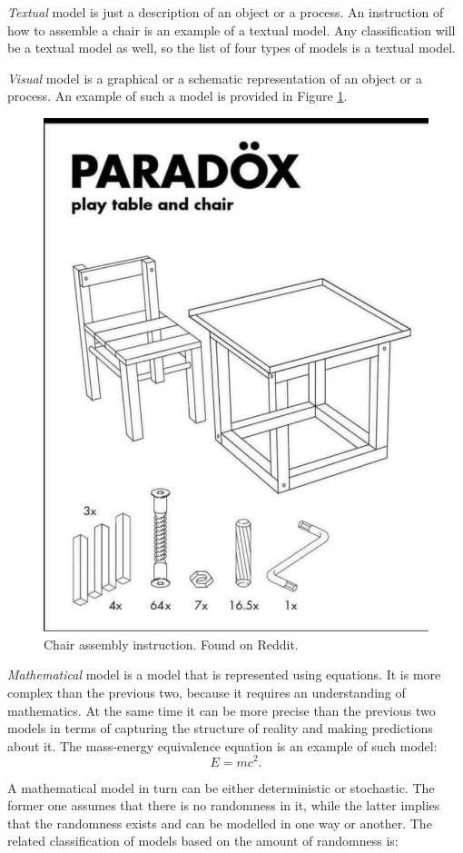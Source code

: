 \documentclass[
]{book}
\theoremstyle{definition}
\theoremstyle{definition}
\theoremstyle{definition}
\theoremstyle{definition}
\theoremstyle{remark}
\begin{document}
\emph{Textual} model is just a description of an object or a process. An instruction of how to assemble a chair is an example of a textual model. Any classification will be a textual model as well, so the list of four types of models is a textual model.

\emph{Visual} model is a graphical or a schematic representation of an object or a process. An example of such a model is provided in Figure \ref{fig:chairAssembly}.

\begin{figure}

{\centering \includegraphics[width=0.6\linewidth]{images/chairAssembly} 

}

\caption{Chair assembly instruction. Found on Reddit.}\label{fig:chairAssembly}
\end{figure}

\emph{Mathematical} model is a model that is represented using equations. It is more complex than the previous two, because it requires an understanding of mathematics. At the same time it can be more precise than the previous two models in terms of capturing the structure of reality and making predictions about it. The mass-energy equivalence equation is an example of such model:
\begin{equation*}
    E = m c^2 .
\end{equation*}

A mathematical model in turn can be either deterministic or stochastic. The former one assumes that there is no randomness in it, while the latter implies that the randomness exists and can be modelled in one way or another. The related classification of models based on the amount of randomness is:
\end{document}

